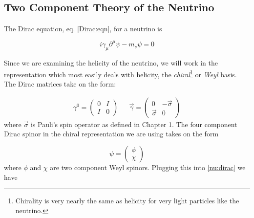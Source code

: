 \documentclass[12pt]{book}
\begin{document}
\subsection{Two Component Theory of the Neutrino}

\paragraph{}The Dirac equation, eq. \ref{Dirac:eqn}, for a neutrino is

\begin{equation}\label{nu:dirac}
 i\gamma_{\mu}\partial^{\mu}\psi-m_{\nu}\psi=0
\end{equation}

Since we are examining the helicity of the neutrino, we will work in the representation which most easily deals with helicity, the \emph{chiral}\footnote{Chirality is very nearly the same as helicity for very light particles like the neutrino.} or \emph{Weyl} basis. The Dirac matrices take on the form:

\begin{align}
\gamma^{0}=\left( \begin{array}{cc}
0 & I \\
I & 0 \end{array} \right) &&
\vec{\gamma}=\left( \begin{array}{cc}
0 & -\vec{\sigma} \\
\vec{\sigma} & 0 \end{array} \right)
\end{align}
where $\vec{\sigma}$ is Pauli's spin operator as defined in Chapter 1. The four component Dirac spinor in the chiral representation we are using takes on the form

\begin{equation}
 \psi=\left( \begin{array}{c}
\phi \\
\chi \end{array} \right)
\end{equation}
where $\phi$ and $\chi$ are two component Weyl spinors. Plugging this into \ref{nu:dirac} we have
\end{document}
